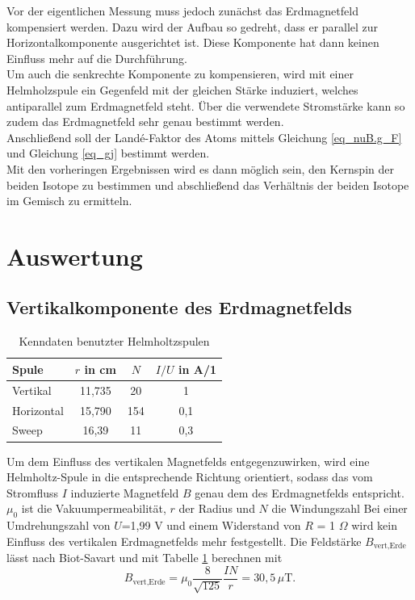 Vor der eigentlichen Messung muss jedoch zunächst das Erdmagnetfeld kompensiert werden. Dazu wird der Aufbau so gedreht, dass er parallel zur Horizontalkomponente ausgerichtet ist. Diese Komponente hat dann keinen Einfluss mehr auf die Durchführung.\\
Um auch die senkrechte Komponente zu kompensieren, wird mit einer Helmholzspule ein Gegenfeld mit der gleichen Stärke induziert, welches antiparallel zum Erdmagnetfeld steht. Über die verwendete Stromstärke kann so zudem das Erdmagnetfeld sehr genau bestimmt werden.\\

Anschließend soll der Landé-Faktor des Atoms mittels Gleichung \eqref{eq_nuB.g_F} und Gleichung \eqref{eq_gj} bestimmt werden.\\

Mit den vorheringen Ergebnissen wird es dann möglich sein, den Kernspin der beiden Isotope zu bestimmen und abschließend das Verhältnis der beiden Isotope im Gemisch zu ermitteln.

\section{Auswertung}
\subsection{Vertikalkomponente des Erdmagnetfelds}
\begin{table}[H]
 \begin{tabular}{l|c|c|c}
  Spule & $r$ in cm & $N$ & $I/U$ in A/1\\
  \hline
  Vertikal & 11,735 & 20 & 1\\
  Horizontal & 15,790 & 154 & 0,1\\
  Sweep & 16,39 & 11 & 0,3
 \end{tabular}
\caption{Kenndaten benutzter Helmholtzspulen}
\label{tab_SpulenHor}
\end{table}
Um dem Einfluss des vertikalen Magnetfelds entgegenzuwirken, wird eine Helmholtz-Spule in die entsprechende Richtung orientiert, sodass das vom 
Stromfluss $I$ induzierte Magnetfeld $B$ genau dem des Erdmagnetfelds entspricht. $\mu_0$ ist die Vakuumpermeabilität, $r$ der Radius und $N$ die Windungszahl
Bei einer Umdrehungszahl von $U$=1,99 V und einem Widerstand von $R$ = 1 $\Omega$ wird kein Einfluss des vertikalen Erdmagnetfelds mehr festgestellt. 
Die Feldstärke $B_{\text{vert,Erde}}$ lässt nach Biot-Savart und mit Tabelle \ref{tab_SpulenHor} berechnen mit
\begin{equation}
 B_{\text{vert,Erde}} = \mu_0 \frac{8}{\sqrt{125}}\frac{I N}{r} = 30,5 \, \mu\text{T}.
\end{equation}
